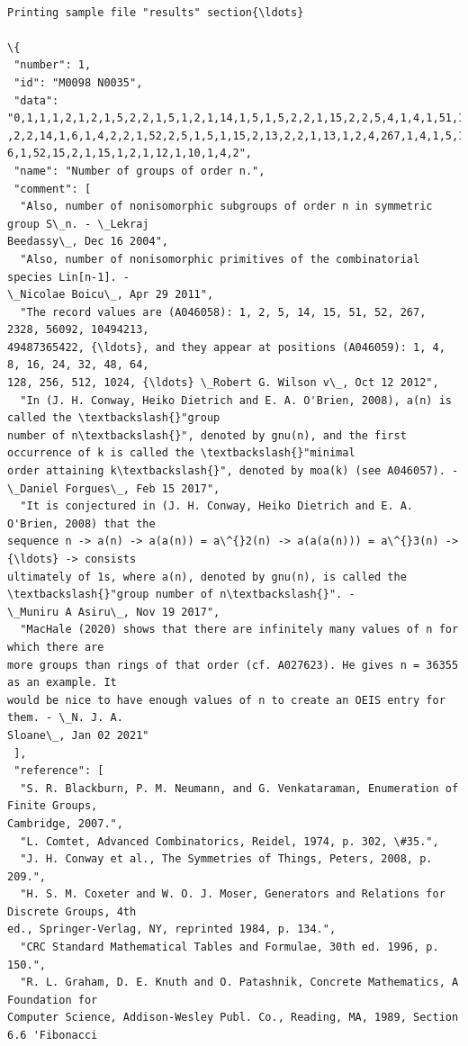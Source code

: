 \documentclass[11pt]{article}
\begin{document}
    \begin{Verbatim}[commandchars=\\\{\}]

Printing sample file "results" section{\ldots}

\{
 "number": 1,
 "id": "M0098 N0035",
 "data": "0,1,1,1,2,1,2,1,5,2,2,1,5,1,2,1,14,1,5,1,5,2,2,1,15,2,2,5,4,1,4,1,51,1,2,1,14,1
,2,2,14,1,6,1,4,2,2,1,52,2,5,1,5,1,15,2,13,2,2,1,13,1,2,4,267,1,4,1,5,1,4,1,50,1,2,3,4,1,
6,1,52,15,2,1,15,1,2,1,12,1,10,1,4,2",
 "name": "Number of groups of order n.",
 "comment": [
  "Also, number of nonisomorphic subgroups of order n in symmetric group S\_n. - \_Lekraj
Beedassy\_, Dec 16 2004",
  "Also, number of nonisomorphic primitives of the combinatorial species Lin[n-1]. -
\_Nicolae Boicu\_, Apr 29 2011",
  "The record values are (A046058): 1, 2, 5, 14, 15, 51, 52, 267, 2328, 56092, 10494213,
49487365422, {\ldots}, and they appear at positions (A046059): 1, 4, 8, 16, 24, 32, 48, 64,
128, 256, 512, 1024, {\ldots} \_Robert G. Wilson v\_, Oct 12 2012",
  "In (J. H. Conway, Heiko Dietrich and E. A. O'Brien, 2008), a(n) is called the \textbackslash{}"group
number of n\textbackslash{}", denoted by gnu(n), and the first occurrence of k is called the \textbackslash{}"minimal
order attaining k\textbackslash{}", denoted by moa(k) (see A046057). - \_Daniel Forgues\_, Feb 15 2017",
  "It is conjectured in (J. H. Conway, Heiko Dietrich and E. A. O'Brien, 2008) that the
sequence n -> a(n) -> a(a(n)) = a\^{}2(n) -> a(a(a(n))) = a\^{}3(n) -> {\ldots} -> consists
ultimately of 1s, where a(n), denoted by gnu(n), is called the \textbackslash{}"group number of n\textbackslash{}". -
\_Muniru A Asiru\_, Nov 19 2017",
  "MacHale (2020) shows that there are infinitely many values of n for which there are
more groups than rings of that order (cf. A027623). He gives n = 36355 as an example. It
would be nice to have enough values of n to create an OEIS entry for them. - \_N. J. A.
Sloane\_, Jan 02 2021"
 ],
 "reference": [
  "S. R. Blackburn, P. M. Neumann, and G. Venkataraman, Enumeration of Finite Groups,
Cambridge, 2007.",
  "L. Comtet, Advanced Combinatorics, Reidel, 1974, p. 302, \#35.",
  "J. H. Conway et al., The Symmetries of Things, Peters, 2008, p. 209.",
  "H. S. M. Coxeter and W. O. J. Moser, Generators and Relations for Discrete Groups, 4th
ed., Springer-Verlag, NY, reprinted 1984, p. 134.",
  "CRC Standard Mathematical Tables and Formulae, 30th ed. 1996, p. 150.",
  "R. L. Graham, D. E. Knuth and O. Patashnik, Concrete Mathematics, A Foundation for
Computer Science, Addison-Wesley Publ. Co., Reading, MA, 1989, Section 6.6 'Fibonacci

\end{Verbatim}
\end{document}
